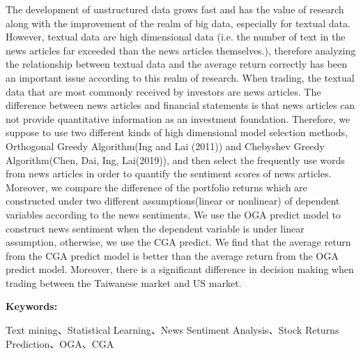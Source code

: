 \begin{abstracten}
The development of unstructured data grows fast and has the value of research along with the improvement of the realm of big data, especially for textual data. However, textual data are high dimensional data (i.e. the number of text in the news articles far exceeded than the news articles themselves.), therefore analyzing the relationship between textual data and the average return correctly has been an important issue according to this realm of research. When trading, the textual data that are most commonly received by investors are news articles. The difference between news articles and financial statements is that news articles can not provide quantitative information as an investment foundation. Therefore, we suppose to use two different kinds of high dimensional model selection methods, Orthogonal Greedy Algorithm(Ing and Lai (2011)) and Chebyshev Greedy Algorithm(Chen, Dai, Ing, Lai(2019)), and then select the frequently use words from news articles in order to quantify the sentiment scores of news articles. Moreover, we compare the difference of the portfolio returns which are constructed under two different assumptions(linear or nonlinear) of dependent variables according to the news sentiments. We use the OGA predict model to construct news sentiment when the dependent variable is under linear assumption, otherwise, we use the CGA predict. We find that the average return from the CGA predict model is better than the average return from the OGA predict model. Moreover, there is a significant difference in decision making when trading between the Taiwanese market and US market.


\par
\noindent
\textbf{Keywords:}
\par
\noindent
Text mining、Statistical Learning、News Sentiment Analysis、Stock Returns Prediction、OGA、CGA
\end{abstracten}
